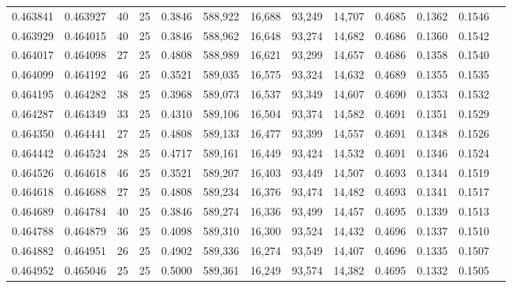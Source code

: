 \begin{tabular}{rrrrrrrrrrrrr}
0.463841 & 0.463927 &    40 &  25 &                                     0.3846 & 588,922 &  16,688 &  93,249 &  14,707 & 0.4685 & 0.1362 & 0.1546 \\
0.463929 & 0.464015 &    40 &  25 &                                     0.3846 & 588,962 &  16,648 &  93,274 &  14,682 & 0.4686 & 0.1360 & 0.1542 \\
0.464017 & 0.464098 &    27 &  25 &                                     0.4808 & 588,989 &  16,621 &  93,299 &  14,657 & 0.4686 & 0.1358 & 0.1540 \\
0.464099 & 0.464192 &    46 &  25 &                                     0.3521 & 589,035 &  16,575 &  93,324 &  14,632 & 0.4689 & 0.1355 & 0.1535 \\
0.464195 & 0.464282 &    38 &  25 &                                     0.3968 & 589,073 &  16,537 &  93,349 &  14,607 & 0.4690 & 0.1353 & 0.1532 \\
0.464287 & 0.464349 &    33 &  25 &                                     0.4310 & 589,106 &  16,504 &  93,374 &  14,582 & 0.4691 & 0.1351 & 0.1529 \\
0.464350 & 0.464441 &    27 &  25 &                                     0.4808 & 589,133 &  16,477 &  93,399 &  14,557 & 0.4691 & 0.1348 & 0.1526 \\
0.464442 & 0.464524 &    28 &  25 &                                     0.4717 & 589,161 &  16,449 &  93,424 &  14,532 & 0.4691 & 0.1346 & 0.1524 \\
0.464526 & 0.464618 &    46 &  25 &                                     0.3521 & 589,207 &  16,403 &  93,449 &  14,507 & 0.4693 & 0.1344 & 0.1519 \\
0.464618 & 0.464688 &    27 &  25 &                                     0.4808 & 589,234 &  16,376 &  93,474 &  14,482 & 0.4693 & 0.1341 & 0.1517 \\
0.464689 & 0.464784 &    40 &  25 &                                     0.3846 & 589,274 &  16,336 &  93,499 &  14,457 & 0.4695 & 0.1339 & 0.1513 \\
0.464788 & 0.464879 &    36 &  25 &                                     0.4098 & 589,310 &  16,300 &  93,524 &  14,432 & 0.4696 & 0.1337 & 0.1510 \\
0.464882 & 0.464951 &    26 &  25 &                                     0.4902 & 589,336 &  16,274 &  93,549 &  14,407 & 0.4696 & 0.1335 & 0.1507 \\
0.464952 & 0.465046 &    25 &  25 &                                     0.5000 & 589,361 &  16,249 &  93,574 &  14,382 & 0.4695 & 0.1332 & 0.1505 \\

\end{tabular}
